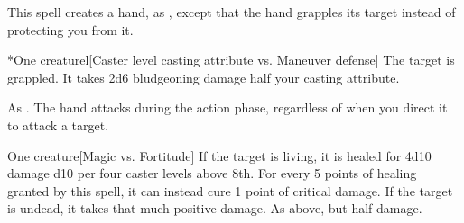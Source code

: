\begin{spellheader}
    \spellrng{\rngmed}
    \spelldur{\durshort \dismissable}
\end{spellheader}
\begin{spelleffects}
    \spelleffect This spell creates a hand, as , except that the hand grapples its target instead of protecting you from it.
    \begin{spelltarget}*{One creature}l[Caster level \add casting attribute vs. Maneuver defense]
        \spellsuccess The target is grappled. It takes 2d6 bludgeoning damage \add half your casting attribute.
    \end{spelltarget}
\end{spelleffects}
\begin{spellfooter}
    \spellnotes As . The hand attacks during the action phase, regardless of when you direct it to attack a target.
\end{spellfooter}

\begin{spellheader}
    \spellrng{\rngclose}
\end{spellheader}
\begin{spelleffects}
    \begin{spelltarget}{One creature}[Magic vs. Fortitude]
        \spelleffect If the target is living, it is healed for 4d10 damage \add d10 per four caster levels above 8th. For every 5 points of healing granted by this spell, it can instead cure 1 point of critical damage.
        \spellsuccess If the target is undead, it takes that much positive damage.
        \spellfailure As above, but half damage.
    \end{spelltarget}
\end{spelleffects}
\begin{spellfooter}
    
\end{spellfooter}

